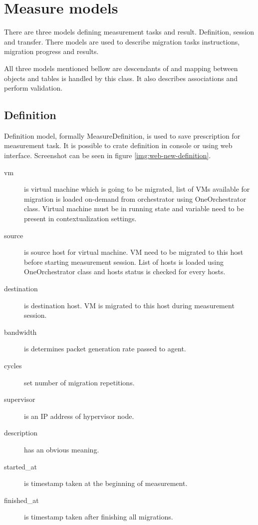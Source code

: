 \section{Measure models}
There are three models defining measurement tasks and result. Definition, session and transfer. There models are used to describe migration tasks instructions, migration progress and results. 

All three models mentioned bellow are descendants of  and mapping between objects and tables is handled by this class. It also describes associations and perform validation.


\subsection{Definition}
Definition model, formally MeasureDefinition, is used to save prescription for measurement task. It is possible to crate definition in console or using web interface. Screenshot can be seen in figure \ref{img:web-new-definition}. 



\begin{description}
	\item[vm] is virtual machine which is going to be migrated, list of \Ac{VM}s available for migration is loaded on-demand from orchestrator using OneOrchestrator class. Virtual machine must be in running state and variable  need to be present in contextualization settings.
	\item[source] is source host for virtual machine. \Ac{VM} need to be migrated to this host before starting measurement session. List of hosts is loaded using OneOrchestrator class and hosts status is checked for every hosts.
	\item[destination] is destination host. \Ac{VM} is migrated to this host during measurement session.
	\item[bandwidth] is determines packet generation rate passed to agent.
	\item[cycles] set number of migration repetitions.
	\item[supervisor] is an \Ac{IP} address of hypervisor node.
	\item[description] has an obvious meaning.

	\item[started\_at] is timestamp taken at the beginning of measurement.
	\item[finished\_at] is timestamp taken after finishing all migrations.
\end{description}

